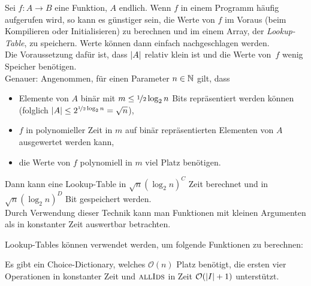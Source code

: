 \documentclass{cheat-sheet}
\renewcommand{\O}{\mathcal{O}} %
\begin{document}
\begin{technik}
  Sei $f : A \to B$ eine Funktion, $A$ endlich.
  Wenn $f$ in einem Programm häufig aufgerufen wird, so kann es günstiger sein, die Werte von $f$ im Voraus (beim Kompilieren oder Initialisieren) zu berechnen und im einem Array, der \emph{Lookup-Table}, zu speichern.
  Werte können dann einfach nachgeschlagen werden. \\
  Die Voraussetzung dafür ist, dass $\lvert A\rvert$ relativ klein ist und die Werte von~$f$ wenig Speicher benötigen. \\
  Genauer: Angenommen, für einen Parameter $n \in \mathbb{N}$ gilt, dass
  \begin{itemize}
    \item Elemente von $A$ binär mit $m \leq \nicefrac{1}{2} \log_2 n$ Bits repräsentiert werden können (folglich $\lvert A\rvert \leq 2^{\nicefrac{1}{2} \log_2 n} = \sqrt{n}$),
    \item $f$ in polynomieller Zeit in $m$ auf binär repräsentierten Elementen von $A$ ausgewertet werden kann,
    \item die Werte von $f$ polynomiell in $m$ viel Platz benötigen.
  \end{itemize}
  Dann kann eine Lookup-Table in $\sqrt{n} (\log_2 n)^C$ Zeit berechnet und in $\sqrt{n} (\log_2 n)^D$ Bit gespeichert werden. \\
  Durch Verwendung dieser Technik kann man Funktionen mit kleinen Argumenten als in konstanter Zeit auswertbar betrachten.
\end{technik}

\begin{bspe}
  Lookup-Tables können verwendet werden, um folgende Funktionen zu berechnen:
  \begin{itemize}
  \end{itemize}
\end{bspe}

\begin{lem}[CD\textsubscript{2}]
  Es gibt ein Choice-Dictionary, welches $\O(n)$ Platz benötigt, die ersten vier Operationen in konstanter Zeit und $\Call{allIds}{}$ in Zeit $\O(\abs{I} + 1)$ unterstützt.
\end{lem}
\end{document}
